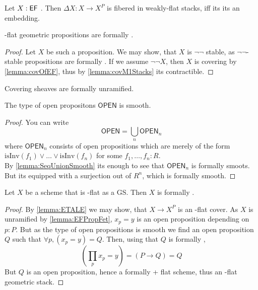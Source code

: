 \begin{corollary}
	Let $X : \mathsf{EF}$ . Then $\Delta X : X \to X^P$ is fibered in weakly-flat stacks, iff its its an embedding.
\end{corollary}
\begin{lemma}{\label{lemma:EFPropFet}}
	\etale-flat geometric propositions are formally \etale.
\end{lemma}
\begin{proof}
	Let $X$ be such a proposition.
	We may show, that $X$ is $\lnot \lnot$ stable, as $\lnot \lnot$-stable propositions are formally \etale. If we assume $\lnot \lnot X$, then $X$ is covering by \ref{lemma:covOfEF}, thus by \ref{lemma:covM1Stacks} its contractible.
\end{proof}
\begin{corollary}
	Covering sheaves are formally unramified.
\end{corollary}
\begin{lemma}{\label{lemma:OpenIsSmooth}}
	The type of open propositons $\mathsf{OPEN}$ is smooth. 
\end{lemma}
\begin{proof}
	You can write 
	\[\mathsf{OPEN} = \bigcup_n \mathsf{OPEN}_n\]
	where $ \mathsf{OPEN}_n$ consists of open propositions which are merely of the form $\mathrm{isInv} (f_1) \lor \hdots \lor \mathrm{isInv} (f_n)$
	for some $f_1,\hdots,f_n : R$. \\
	By \ref{lemma:SeqUnionSmooth} its enough to see that $\mathsf{OPEN}_n$ is formally smoots. But its equipped with a surjection out of $R^n$, which is formally smooth.
\end{proof}





\begin{lemma}{\label{lemma:schemeEFIsFEt}}
	Let $X$ be a scheme that is \etale-flat as a GS. Then $X$ is formally \etale.
\end{lemma}
\begin{proof}
	By \ref{lemma:ETALE} we may show, that $X \to X^P$ is an \etale-flat cover. 	As $X$ is unramified by \ref{lemma:EFPropFet}, $x_p = y$ is an open proposition depending on $p : P$. But as the type of open propositions is smooth we find an open proposition $Q$ such that $\forall p, (x_p = y) = Q$. Then, using that $Q$ is formally \etale, %
	\[(\prod_{p} x_p = y) = (P \to Q) = Q\] %
	But $Q$ is an open proposition, hence a formally \etale + flat scheme, thus an \etale-flat geometric stack.		
	
\end{proof}

